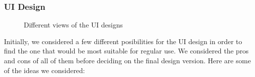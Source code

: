 \documentclass[11pt, a4paper]{article}
\begin{document}
\subsubsection{UI Design}
\begin{figure}[h!]
\centering
{}
\quad
{}
\caption{Different views of the UI designs}
\end{figure}

Initially, we considered a few different posibilities for the UI design in order to find the one that would be most suitable for regular use. We considered the pros and cons of all of them before deciding on the final design version. Here are some of the ideas we considered:
\end{document}

